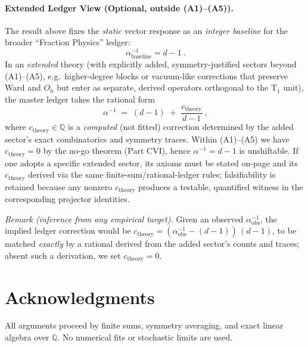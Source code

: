 \documentclass[11pt]{article}
\theoremstyle{definition}
\newcommand{\1}{\mathbf{1}}
\begin{document}
\paragraph{Extended Ledger View (Optional, outside (A1)--(A5)).}
The result above fixes the \emph{static} vector response as an \emph{integer baseline} for the broader “Fraction Physics” ledger:
\[
\boxed{\ \alpha^{-1}_{\text{baseline}}=d-1\ }.
\]
In an \emph{extended} theory (with explicitly added, symmetry-justified sectors beyond (A1)--(A5), e.g.\ higher-degree blocks or vacuum-like corrections that preserve Ward and $O_h$ but enter as separate, derived operators orthogonal to the T$_1$ unit), the master ledger takes the rational form
\[
\boxed{\ \alpha^{-1} \;=\; (d-1)\;+\;\frac{c_{\mathrm{theory}}}{\,d-1\,}\ },
\]
where $c_{\mathrm{theory}} \in \mathbb{Q}$ is a \emph{computed} (not fitted) correction determined by the added sector’s exact combinatorics and symmetry traces.
Within (A1)--(A5) we have $c_{\mathrm{theory}}=0$ by the no-go theorem (Part CVI), hence $\alpha^{-1}=d-1$ is unshiftable.
If one adopts a specific extended sector, its axioms must be stated on-page and its $c_{\mathrm{theory}}$ derived via the same finite-sum/rational-ledger rules; falsifiability is retained because any nonzero $c_{\mathrm{theory}}$ produces a testable, quantified witness in the corresponding projector identities.

\emph{Remark (inference from any empirical target).} Given an observed $\alpha^{-1}_{\text{obs}}$, the implied ledger correction would be
\(
c_{\mathrm{theory}}=(\alpha^{-1}_{\text{obs}}-(d-1))\,(d-1)
\),
to be matched \emph{exactly} by a rational derived from the added sector’s counts and traces; absent such a derivation, we set $c_{\mathrm{theory}}=0$.


\section*{Acknowledgments}
All arguments proceed by finite sums, symmetry averaging, and exact linear algebra over \(\mathbb{Q}\). No numerical fits or stochastic limits are used.
\end{document}

